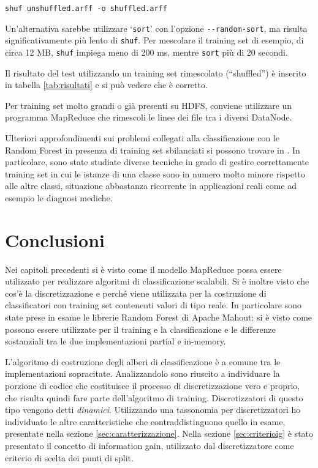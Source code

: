 \documentclass[a4paper,11pt,twoside,openright,fleqn]{book}
\newcommand{\code}[1]{\texttt{#1}}
\begin{document}
\code{shuf unshuffled.arff -o shuffled.arff}

Un'alternativa sarebbe utilizzare `\code{sort}' con l'opzione \code{-{}-random-sort}, ma risulta significativamente più lento di \code{shuf}. Per mescolare il training set di esempio, di circa 12 MB, \code{shuf} impiega meno di 200 ms, mentre \code{sort} più di 20 secondi.

Il risultato del test utilizzando un training set rimescolato (``shuffled'') è inserito in tabella \ref{tab:risultati} e si può vedere che è corretto.

Per training set molto grandi o già presenti su HDFS, conviene utilizzare un programma MapReduce che rimescoli le linee dei file tra i diversi DataNode.

Ulteriori approfondimenti sui problemi collegati alla classificazione con le Random Forest in presenza di training set sbilanciati si possono trovare in \cite{delRio:2014}. In particolare, sono state studiate diverse tecniche in grado di gestire correttamente training set in cui le istanze di una classe sono in numero molto minore rispetto alle altre classi, situazione abbastanza ricorrente in applicazioni reali come ad esempio le diagnosi mediche.

\chapter*{Conclusioni}

Nei capitoli precedenti si è visto come il modello MapReduce possa essere utilizzato per realizzare algoritmi di classificazione scalabili. Si è inoltre visto che cos'è la discretizzazione e perché viene utilizzata per la costruzione di classificatori con training set contenenti valori di tipo reale. In particolare sono state prese in esame le librerie Random Forest di Apache Mahout: si è visto come possono essere utilizzate per il training e la classificazione e le differenze sostanziali tra le due implementazioni partial e in-memory.

L'algoritmo di costruzione degli alberi di classificazione è a comune tra le implementazioni sopracitate. Analizzandolo sono riuscito a individuare la porzione di codice che costituisce il processo di discretizzazione vero e proprio, che risulta quindi fare parte dell'algoritmo di training. Discretizzatori di questo tipo vengono detti \emph{dinamici}. Utilizzando una tassonomia per discretizzatori ho individuato le altre caratteristiche che contraddistinguono quello in esame, presentate nella sezione \ref{sec:caratterizzazione}. Nella sezione \ref{sec:criterioig} è stato presentato il concetto di information gain, utilizzato dal discretizzatore come criterio di scelta dei punti di split.
\end{document}
